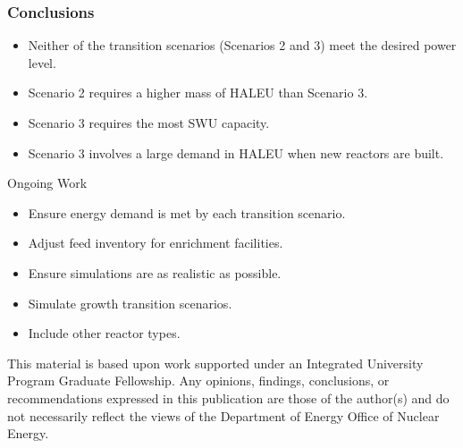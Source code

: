 \begin{frame}
\frametitle{Conclusions}
    \begin{itemize}
        \item Neither of the transition scenarios (Scenarios 2 and 3) meet the desired power level.
        \item Scenario 2 requires a higher mass of \gls{HALEU} than Scenario 3.
        \item Scenario 3 requires the most \gls{SWU} capacity.
        \item Scenario 3 involves a large demand in \gls{HALEU} when 
              new reactors are built.
    \end{itemize}

    \begin{block}{Ongoing Work}
        \begin{itemize}
            \item Ensure energy demand is met by each transition scenario.
            \item Adjust feed inventory for enrichment facilities.
            \item Ensure simulations are as realistic as possible.
            \item Simulate growth transition scenarios.
            \item Include other reactor types.
        \end{itemize}
    \end{block}
    \vspace{1.7cm}
    \scriptsize
    This material is based upon work supported under an Integrated University 
Program Graduate Fellowship. Any opinions, findings, conclusions, or 
recommendations expressed in this publication are those of the author(s) 
and do not necessarily reflect the views of the Department of Energy Office 
of Nuclear Energy.

\end{frame}
